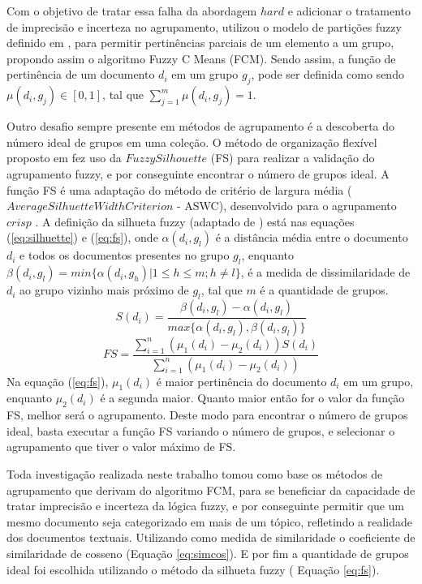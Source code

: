 Com o objetivo de tratar essa falha da abordagem $hard$ e adicionar o tratamento de imprecisão 
e incerteza no agrupamento,
\cite{Bezdek1984} utilizou o modelo de partições fuzzy definido em \cite{Zadeh1965}, para permitir
pertinências parciais de um elemento a um grupo, propondo assim o algoritmo Fuzzy C Means (FCM). 
Sendo assim, a função de pertinência de um documento $d_{i}$ em um grupo $g_{j}$, pode ser definida como sendo $\mu(d_{i}, g_{j}) \in [0,1]$, 
tal que $\sum_{j=1}^m \mu(d_{i}, g_{j}) = 1$.

Outro desafio sempre presente em métodos de agrupamento é a descoberta do número ideal de grupos
em uma coleção. O método de organização flexível proposto em \cite{Nogueira2013} 
fez uso da $Fuzzy Silhouette$ (FS) para realizar a validação do agrupamento fuzzy, e por conseguinte
encontrar o número de grupos ideal. A função FS é uma adaptação do método de critério de largura 
média ($Average  Silhuette Width Criterion$ - ASWC), desenvolvido para o agrupamento $crisp$
\cite{Nogueira2013}. A definição da silhueta fuzzy (adaptado de \cite{Nogueira2013}) 
está nas equações (\ref{eq:silhuette}) e (\ref{eq:fs}), onde $\alpha(d_i, g_l)$ é a distância 
média entre o documento $d_i$ e todos os documentos 
presentes no grupo $g_l$, enquanto 
$\beta(d_i,g_l) = min\{\alpha(d_i,g_h) | 1 \leq h \leq m; h \neq l\}$, é a 
medida de dissimilaridade de $d_i$ ao grupo vizinho mais próximo de $g_l$, tal que $m$ é a 
quantidade de grupos.
\begin{equation}
  S(d_i) = \frac{\beta(d_i, g_l) - \alpha(d_i,g_l)}{max\{\alpha(d_i,g_l), \beta(d_i,g_l)\}}
  \label{eq:silhuette}
\end{equation}
\begin{equation}
  FS = \frac{\sum_{i=1}^n{(\mu_1(d_i) - \mu_2(d_i))}S(d_i)}{\sum_{i=1}^n{(\mu_1(d_i) - \mu_2(d_i))}}
  \label{eq:fs}
\end{equation}
Na equação (\ref{eq:fs}), $\mu_1(d_i)$ é maior pertinência do documento $d_i$ em um grupo, enquanto 
$\mu_2(d_i)$ é a segunda maior. Quanto maior então for o valor da função FS, melhor será o 
agrupamento. Deste modo para encontrar o número de grupos ideal, basta executar a função FS 
variando o número de grupos, e selecionar o agrupamento que tiver o valor máximo de FS.

Toda investigação realizada neste trabalho tomou como base os métodos de agrupamento que 
derivam do algoritmo FCM\cite{Bezdek1984}, para se beneficiar da capacidade de tratar imprecisão e 
incerteza da lógica fuzzy, e por conseguinte permitir que um mesmo documento seja categorizado 
em mais de um tópico, refletindo a realidade dos documentos textuais. Utilizando como medida
de similaridade o coeficiente de similaridade de cosseno (Equação \ref{eq:simcos}). E por fim a quantidade
de grupos ideal foi escolhida utilizando o método da silhueta fuzzy ( Equação \ref{eq:fs}).


